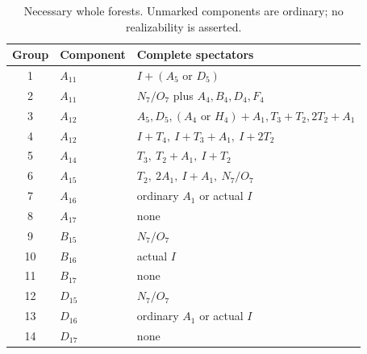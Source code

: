 \documentclass[11pt]{article}
\begin{document}
\begin{table}[ht]\centering\small
\begin{tabular}{clp{8.4cm}}
\toprule Group&Component&Complete spectators\\\midrule
1&$A_{11}$&$I+(A_5\text{ or }D_5)$\\
2&$A_{11}$&$N_7/O_7$ plus $A_4,B_4,D_4,F_4$\\
3&$A_{12}$&$A_5,D_5,(A_4\text{ or }H_4)+A_1,T_3+T_2,2T_2+A_1$\\
4&$A_{12}$&$I+T_4,\ I+T_3+A_1,\ I+2T_2$\\
5&$A_{14}$&$T_3,\ T_2+A_1,\ I+T_2$\\
6&$A_{15}$&$T_2,\ 2A_1,\ I+A_1,\ N_7/O_7$\\
7&$A_{16}$&ordinary $A_1$ or actual $I$\\
8&$A_{17}$&none\\
9&$B_{15}$&$N_7/O_7$\\
10&$B_{16}$&actual $I$\\
11&$B_{17}$&none\\
12&$D_{15}$&$N_7/O_7$\\
13&$D_{16}$&ordinary $A_1$ or actual $I$\\
14&$D_{17}$&none\\\bottomrule
\end{tabular}
\caption{Necessary whole forests. Unmarked components are ordinary;
no realizability is asserted.}\label{tab:f17}
\end{table}
\end{document}
